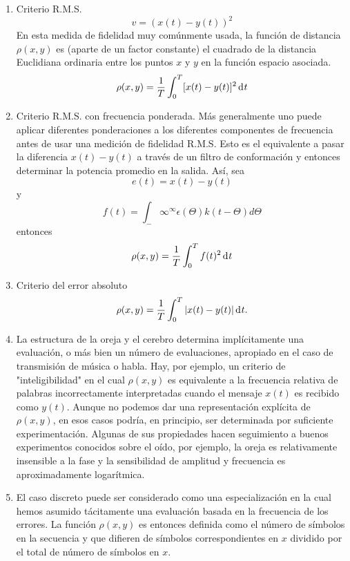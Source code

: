 \begin{enumerate}
\item{Criterio R.M.S. 
\begin{equation} v = (x(t) - y(t))^{2} \end{equation}
En esta medida de fidelidad muy com\'unmente usada, la funci\'on de
distancia $\rho(x,y)$ es (aparte de un factor constante) el cuadrado
de la distancia Euclidiana ordinaria entre los puntos $x$ y $y$ en la
funci\'on espacio asociada.
\begin{equation} \rho(x, y) = \frac{1}{T} \int_0^T  [x(t) - y(t)]^{2}  \diff t  \end{equation}}
\item{Criterio R.M.S. con frecuencia ponderada. M\'as generalmente uno puede
aplicar diferentes ponderaciones a los diferentes componentes de frecuencia
antes de usar una medici\'on de fidelidad R.M.S. Esto es el equivalente a pasar
la diferencia $x(t) - y(t)$ a trav\'es de un filtro de conformaci\'on y entonces 
determinar la potencia promedio en la salida.
As\'i, sea 
\begin{equation} e(t) = x(t) - y(t) \end{equation}
y
\begin{equation} f(t) = \int_-\infty^\infty   \epsilon(\Theta)k(t - \Theta) d\Theta \end{equation}
entonces
\begin{equation} \rho (x, y) = \frac{1}{T} \int_0^T f(t)^{2}  \diff t  \end{equation}}
\item{Criterio del error absoluto
\begin{equation} \rho(x,y) = \frac{1}{T} \int_0^T | x(t) - y(t)|  \diff t . \end{equation}}
\item{La estructura de la oreja y el cerebro determina impl\'icitamente una evaluaci\'on,
o m\'as bien un n\'umero de evaluaciones, apropiado en el caso de transmisi\'on
de m\'usica o habla. Hay, por ejemplo, un criterio de "inteligibilidad" en el cual
$\rho(x,y)$ es equivalente a la frecuencia relativa de palabras incorrectamente
interpretadas cuando el mensaje $x(t)$ es recibido como $y(t)$. Aunque no podemos
dar una representaci\'on expl\'icita de $\rho(x,y)$, en esos casos podr\'ia, en principio,
ser determinada por suficiente experimentaci\'on. Algunas de sus propiedades hacen
seguimiento a buenos experimentos conocidos sobre el o\'ido, por ejemplo, la 
oreja es relativamente insensible a la fase y la sensibilidad de amplitud y frecuencia
es aproximadamente logar\'itmica.}
\item{El caso discreto puede ser considerado como una
  especializaci\'on en la cual hemos asumido t\'acitamente una
  evaluaci\'on basada en la frecuencia de los errores.  La funci\'on
  $\rho(x,y)$ es entonces definida como el n\'umero de s\'imbolos en
  la secuencia y que difieren de s\'imbolos correspondientes en $x$
  dividido por el total de n\'umero de s\'imbolos en $x$.}
\end{enumerate}

